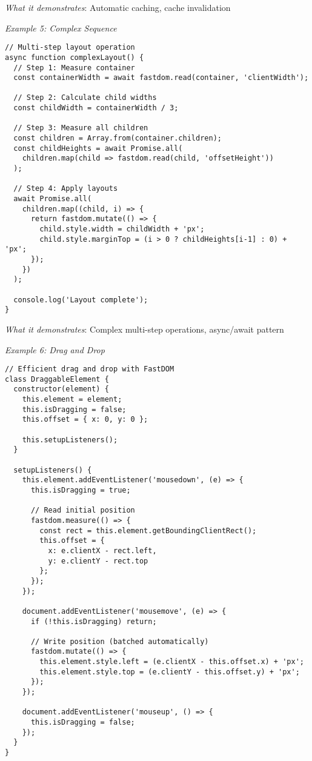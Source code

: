 \documentclass[11pt]{article}
\begin{document}
\emph{What it demonstrates}: Automatic caching, cache invalidation

\emph{Example 5: Complex Sequence}

\begin{verbatim}
// Multi-step layout operation
async function complexLayout() {
  // Step 1: Measure container
  const containerWidth = await fastdom.read(container, 'clientWidth');
  
  // Step 2: Calculate child widths
  const childWidth = containerWidth / 3;
  
  // Step 3: Measure all children
  const children = Array.from(container.children);
  const childHeights = await Promise.all(
    children.map(child => fastdom.read(child, 'offsetHeight'))
  );
  
  // Step 4: Apply layouts
  await Promise.all(
    children.map((child, i) => {
      return fastdom.mutate(() => {
        child.style.width = childWidth + 'px';
        child.style.marginTop = (i > 0 ? childHeights[i-1] : 0) + 'px';
      });
    })
  );
  
  console.log('Layout complete');
}
\end{verbatim}

\emph{What it demonstrates}: Complex multi-step operations, async/await pattern

\emph{Example 6: Drag and Drop}

\begin{verbatim}
// Efficient drag and drop with FastDOM
class DraggableElement {
  constructor(element) {
    this.element = element;
    this.isDragging = false;
    this.offset = { x: 0, y: 0 };
    
    this.setupListeners();
  }
  
  setupListeners() {
    this.element.addEventListener('mousedown', (e) => {
      this.isDragging = true;
      
      // Read initial position
      fastdom.measure(() => {
        const rect = this.element.getBoundingClientRect();
        this.offset = {
          x: e.clientX - rect.left,
          y: e.clientY - rect.top
        };
      });
    });
    
    document.addEventListener('mousemove', (e) => {
      if (!this.isDragging) return;
      
      // Write position (batched automatically)
      fastdom.mutate(() => {
        this.element.style.left = (e.clientX - this.offset.x) + 'px';
        this.element.style.top = (e.clientY - this.offset.y) + 'px';
      });
    });
    
    document.addEventListener('mouseup', () => {
      this.isDragging = false;
    });
  }
}
\end{verbatim}
\end{document}
